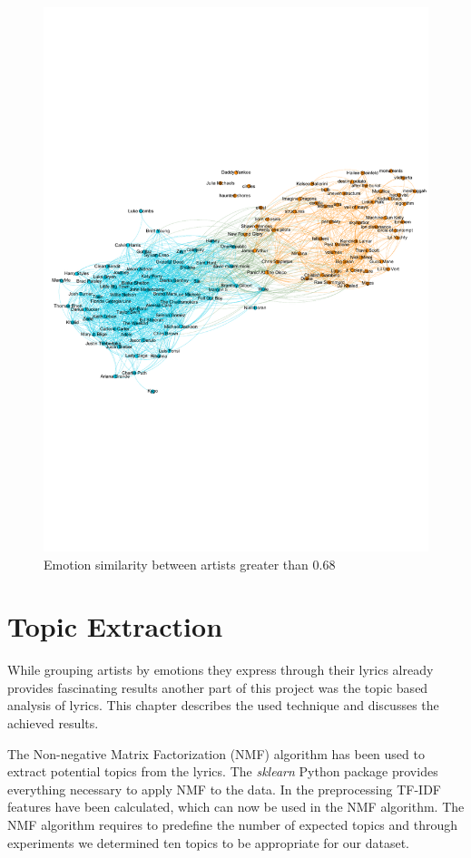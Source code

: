 \documentclass[10pt,a4paper]{article}
\begin{document}
		\begin{figure}[htb]
			\centering
			\includegraphics[trim=0mm 5mm 0mm 5mm, clip, width=0.8\linewidth]{data/emotion_similarity}
			\caption{Emotion similarity between artists greater than $0.68$}
			\label{fig:emotionsimilarity}
		\end{figure}
	
	\section{Topic Extraction}
	\label{sec:topicextraction}
	While grouping artists by emotions they express through their lyrics already provides fascinating results another part of this project was the topic based analysis of lyrics. This chapter describes the used technique and discusses the achieved results.
	
	The Non-negative Matrix Factorization (NMF) algorithm has been used to extract potential topics from the lyrics. The \textit{sklearn} Python package provides everything necessary to apply NMF to the data. In the preprocessing TF-IDF features have been calculated, which can now be used in the NMF algorithm. The NMF algorithm requires to predefine the number of expected topics and through experiments we determined ten topics to be appropriate for our dataset. 
	
\end{document}
